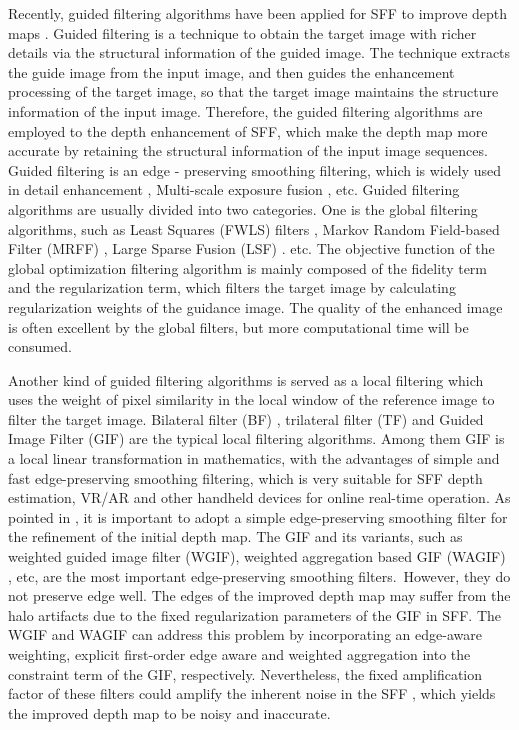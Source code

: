 \documentclass[a4paper,fleqn]{cas-dc}
\begin{document}
Recently, guided filtering algorithms have been applied for SFF to improve depth maps \cite{ali2021guided,ali2021depth}. Guided filtering is a technique to obtain the target image with richer details via the structural information of the guided image. The technique extracts the guide image from the input image, and then guides the enhancement processing of the target image, so that the target image maintains the structure information of the input image. Therefore, the guided filtering algorithms are employed to the depth enhancement of SFF, which make the depth map more accurate by retaining the structural information of the input image sequences. Guided filtering is an edge - preserving smoothing filtering, which is widely used in detail enhancement \cite{kou2015content,kou2018itelligent}, Multi-scale exposure fusion \cite{kou2017multi},  etc. Guided filtering algorithms are usually divided into two categories. One is the global filtering algorithms, such as Least Squares (FWLS) filters \cite{kim2017fast}, Markov Random Field-based Filter (MRFF) \cite{diebel2005an}, Large Sparse Fusion (LSF) \cite{harrison2010image}. etc. The objective function of the global optimization filtering algorithm is mainly composed of the fidelity term and the regularization term, which filters the target image by calculating regularization weights of the guidance image. The quality of the enhanced image is often excellent by the global filters, but more computational time will be consumed. 

Another kind of guided filtering algorithms is served as a local filtering which uses the weight of pixel similarity in the local window of the reference image to filter the target image. Bilateral filter (BF) \cite{tomasil1998bilateral}, trilateral filter (TF) \cite{choudhury2003the} and Guided Image Filter (GIF) \cite{he2013guided} are the typical local filtering algorithms. Among them GIF is a local linear transformation in mathematics, with the advantages of simple and fast edge-preserving smoothing filtering, which is very suitable for SFF depth estimation, VR/AR and other handheld devices for online real-time operation. As pointed in \cite{ali2021guided}, it is important to adopt a simple edge-preserving smoothing filter for the refinement of the initial depth map. The GIF and its variants, such as weighted guided image filter (WGIF)\cite{li2015weighted}, weighted aggregation based GIF (WAGIF) \cite{chen2020weighted}, etc, are the most important edge-preserving smoothing filters. However, they do not preserve edge well. The edges of the improved depth map may suffer from the halo artifacts due to the fixed regularization parameters of the GIF \cite{he2013guided} in SFF. The WGIF \cite{li2015weighted} and WAGIF\cite{chen2020weighted} can address this problem by incorporating an edge-aware weighting, explicit first-order edge aware and weighted aggregation into the constraint term of the GIF, respectively. Nevertheless, the fixed amplification factor of these filters could amplify the inherent noise in the SFF \cite{ali2021guided}, which yields the improved depth map to be noisy and inaccurate.
\end{document}
